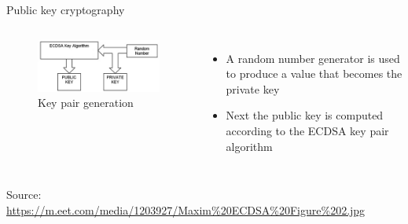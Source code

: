 \documentclass[10pt]{beamer}
\begin{document}

\begin{frame}{Public key cryptography}
	\begin{columns}
		\begin{figure}[]
			\centering
			\includegraphics  [scale=0.4]{Images/ECDSA3}
			\caption{Key pair generation}
		\end{figure}
		\begin{itemize}
			\item A random number generator is used to produce a value that becomes the private key
			\item Next the public key is computed according to the ECDSA key pair algorithm
		\end{itemize}
	\end{columns}
	\begin{tiny}
		Source: \href{https://eng.paxos.com/blockchain-separating-hype-from-substance-part-2}{https://m.eet.com/media/1203927/Maxim\%20ECDSA\%20Figure\%202.jpg}
	\end{tiny}
\end{frame}


\end{document}
